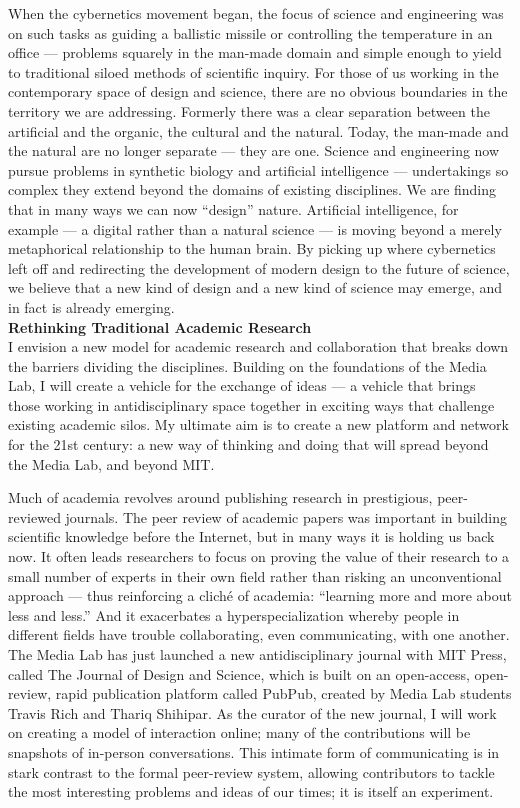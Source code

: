 When the cybernetics movement began, the focus of science and engineering was on such tasks as guiding a ballistic missile or controlling the temperature in an office --- problems squarely in the man-made domain and simple enough to yield to traditional siloed methods of scientific inquiry. For those of us working in the contemporary space of design and science, there are no obvious boundaries in the territory we are addressing. Formerly there was a clear separation between the artificial and the organic, the cultural and the natural. Today, the man-made and the natural are no longer separate --- they are one. 
Science and engineering now pursue problems in synthetic biology and artificial intelligence --- undertakings so complex they extend beyond the domains of existing disciplines. We are finding that in many ways we can now ``design'' nature. Artificial intelligence, for example --- a digital rather than a natural science --- is moving beyond a merely metaphorical relationship to the human brain. By picking up where cybernetics left off and redirecting the development of modern design to the future of science, we believe that a new kind of design and a new kind of science may emerge, and in fact is already emerging. \\

\textbf{Rethinking Traditional Academic Research} \\

I envision a new model for academic research and collaboration that breaks down the barriers dividing the disciplines. Building on the foundations of the Media Lab, I will create a vehicle for the exchange of ideas --- a vehicle that brings those working in antidisciplinary space together in exciting ways that challenge existing academic silos. My ultimate aim is to create a new platform and network for the 21st century: a new way of thinking and doing that will spread beyond the Media Lab, and beyond MIT.

Much of academia revolves around publishing research in prestigious, peer-reviewed journals. The peer review of academic papers was important in building scientific knowledge before the Internet, but in many ways it is holding us back now. It often leads researchers to focus on proving the value of their research to a small number of experts in their own field rather than risking an unconventional approach --- thus reinforcing a cliché of academia: ``learning more and more about less and less.'' And it exacerbates a hyperspecialization whereby people in different fields have trouble collaborating, even communicating, with one another. The Media Lab has just launched a new antidisciplinary journal with MIT Press, called The Journal of Design and Science, which is built on an open-access, open-review, rapid publication platform called PubPub, created by Media Lab students Travis Rich and Thariq Shihipar. As the curator of the new journal, I will work on creating a model of interaction online; many of the contributions will be snapshots of in-person conversations. This intimate form of communicating is in stark contrast to the formal peer-review system, allowing contributors to tackle the most interesting problems and ideas of our times; it is itself an experiment.

